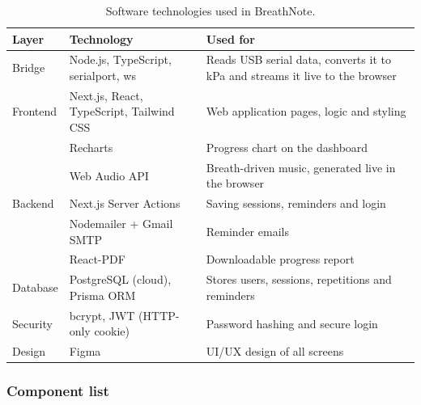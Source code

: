 \documentclass[12pt,a4paper]{article}
\renewcommand{\arraystretch}{1.2}
\begin{document}
\begin{table}[H]
\centering
\caption{Software technologies used in BreathNote.}
\label{tab:tech}
\footnotesize
\renewcommand{\arraystretch}{1.05}
\begin{tabularx}{\linewidth}{@{}P{2.0cm} P{4.4cm} L@{}}
\toprule
\textbf{Layer} & \textbf{Technology} & \textbf{Used for} \\
\midrule
Bridge   & Node.js, TypeScript, serialport, ws & Reads USB serial data, converts it to kPa and streams it live to the browser \\
Frontend & Next.js, React, TypeScript, Tailwind CSS & Web application pages, logic and styling \\
         & Recharts                 & Progress chart on the dashboard \\
         & Web Audio API            & Breath-driven music, generated live in the browser \\
Backend  & Next.js Server Actions   & Saving sessions, reminders and login \\
         & Nodemailer + Gmail SMTP  & Reminder emails \\
         & React-PDF                & Downloadable progress report \\
Database & PostgreSQL (cloud), Prisma ORM & Stores users, sessions, repetitions and reminders \\
Security & bcrypt, JWT (HTTP-only cookie) & Password hashing and secure login \\
Design   & Figma                    & UI/UX design of all screens \\
\bottomrule
\end{tabularx}
\end{table}

\subsubsection*{Component list}
\label{sec:components}
\end{document}
